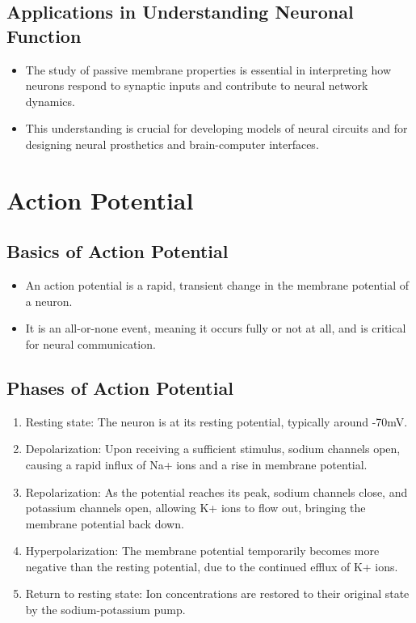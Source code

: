 \documentclass{article}
\begin{document}
\subsection{Applications in Understanding Neuronal Function}
\begin{itemize}
    \item The study of passive membrane properties is essential in interpreting how neurons respond to synaptic inputs and contribute to neural network dynamics.
    \item This understanding is crucial for developing models of neural circuits and for designing neural prosthetics and brain-computer interfaces.
\end{itemize}

\section{Action Potential}

\subsection{Basics of Action Potential}
\begin{itemize}
    \item An action potential is a rapid, transient change in the membrane potential of a neuron.
    \item It is an all-or-none event, meaning it occurs fully or not at all, and is critical for neural communication.
\end{itemize}

\subsection{Phases of Action Potential}
\begin{enumerate}
    \item Resting state: The neuron is at its resting potential, typically around -70mV.
    \item Depolarization: Upon receiving a sufficient stimulus, sodium channels open, causing a rapid influx of Na+ ions and a rise in membrane potential.
    \item Repolarization: As the potential reaches its peak, sodium channels close, and potassium channels open, allowing K+ ions to flow out, bringing the membrane potential back down.
    \item Hyperpolarization: The membrane potential temporarily becomes more negative than the resting potential, due to the continued efflux of K+ ions.
    \item Return to resting state: Ion concentrations are restored to their original state by the sodium-potassium pump.
\end{enumerate}
\end{document}
